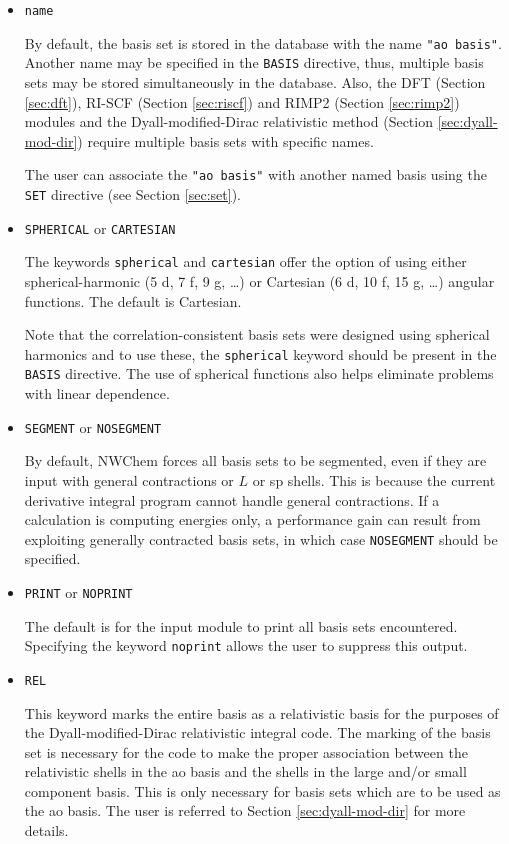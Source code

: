 \begin{itemize}
\item {\tt name}

  By default, the basis set is stored in the database with the name
  \verb+"ao basis"+.  Another name may be specified in the \verb+BASIS+
  directive, thus, multiple basis sets may be stored simultaneously in the
  database.  Also, the DFT (Section \ref{sec:dft}), RI-SCF (Section
  \ref{sec:riscf}) and RIMP2 (Section \ref{sec:rimp2}) modules and the
  Dyall-modified-Dirac relativistic method (Section \ref{sec:dyall-mod-dir})
  require multiple basis sets with specific names.

The user can associate the \verb+"ao basis"+ with another named basis
using the \verb+SET+ directive (see Section \ref{sec:set}).  

\item {{\tt SPHERICAL} or {\tt CARTESIAN}}

The keywords \verb+spherical+ and \verb+cartesian+ offer the option of
using either spherical-harmonic (5 d, 7 f, 9 g, \ldots) or Cartesian
(6 d, 10 f, 15 g, \ldots) angular functions.  The default is
Cartesian.  

Note that the correlation-consistent basis sets were designed using
spherical harmonics and to use these, the \verb+spherical+ keyword
should be present in the \verb+BASIS+ directive.  The use of spherical
functions also helps eliminate problems with linear dependence.


\item {{\tt SEGMENT} or {\tt NOSEGMENT}}

By default, NWChem forces all basis sets to be segmented, 
even if they are input with general contractions or $L$ or sp
shells. This is because the current derivative integral program cannot
handle general contractions.  If a calculation is  
computing energies only, a 
performance gain can result from exploiting generally contracted basis
sets, in which case {\tt NOSEGMENT} should be specified.

\item {{\tt PRINT} or {\tt NOPRINT}}

The default is for the input module to print all basis sets encountered.
Specifying the keyword \verb+noprint+ allows the user to suppress this output.

\item {{\tt REL}}

This keyword marks the entire basis as a relativistic basis for the purposes
of the Dyall-modified-Dirac relativistic integral code. The marking of the
basis set is necessary for the code to make the proper association between
the relativistic shells in the ao basis and the shells in the large and/or
small component basis. This is only necessary for basis sets which are to be
used as the ao basis. The user is referred to Section \ref{sec:dyall-mod-dir}  
for more details.

\end{itemize}


